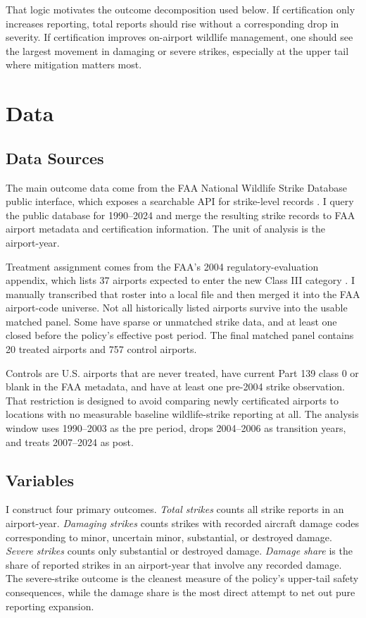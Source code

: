 \documentclass[12pt]{article}
\begin{document}
That logic motivates the outcome decomposition used below. If certification only increases reporting, total reports should rise without a corresponding drop in severity. If certification improves on-airport wildlife management, one should see the largest movement in damaging or severe strikes, especially at the upper tail where mitigation matters most.

\section{Data}

\subsection{Data Sources}

The main outcome data come from the FAA National Wildlife Strike Database public interface, which exposes a searchable API for strike-level records \citep{faa_wildlife_db_2024}. I query the public database for 1990--2024 and merge the resulting strike records to FAA airport metadata and certification information. The unit of analysis is the airport-year.

Treatment assignment comes from the FAA's 2004 regulatory-evaluation appendix, which lists 37 airports expected to enter the new Class III category \citep{faa_reg_eval_2004}. I manually transcribed that roster into a local file and then merged it into the FAA airport-code universe. Not all historically listed airports survive into the usable matched panel. Some have sparse or unmatched strike data, and at least one closed before the policy's effective post period. The final matched panel contains 20 treated airports and 757 control airports.

Controls are U.S. airports that are never treated, have current Part 139 class 0 or blank in the FAA metadata, and have at least one pre-2004 strike observation. That restriction is designed to avoid comparing newly certificated airports to locations with no measurable baseline wildlife-strike reporting at all. The analysis window uses 1990--2003 as the pre period, drops 2004--2006 as transition years, and treats 2007--2024 as post.

\subsection{Variables}

I construct four primary outcomes. \textit{Total strikes} counts all strike reports in an airport-year. \textit{Damaging strikes} counts strikes with recorded aircraft damage codes corresponding to minor, uncertain minor, substantial, or destroyed damage. \textit{Severe strikes} counts only substantial or destroyed damage. \textit{Damage share} is the share of reported strikes in an airport-year that involve any recorded damage. The severe-strike outcome is the cleanest measure of the policy's upper-tail safety consequences, while the damage share is the most direct attempt to net out pure reporting expansion.
\end{document}
